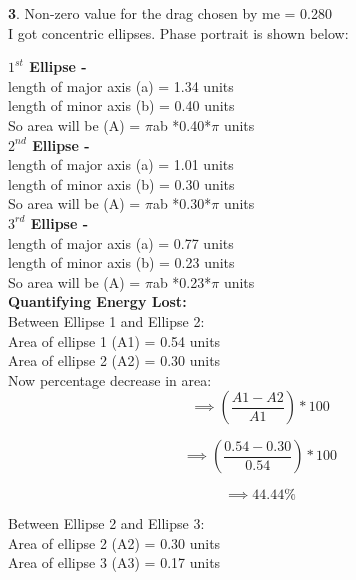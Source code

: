 \documentclass[11pt]{scrartcl} %
\begin{document}
\newpage
\textbf{3}.
Non-zero value for the drag chosen by me = 0.280 \\
I got concentric ellipses. Phase portrait is shown below:


\textbf{$1^{st}$ Ellipse - }\\
length of major axis (a) = 1.34 units\\
length of minor axis (b) = 0.40 units\\

So area will be (A) = $\pi$ab *0.40*$\pi$  units\\

\textbf{$2^{nd}$ Ellipse - }\\
length of major axis (a) = 1.01 units\\
length of minor axis (b) = 0.30 units\\

So area will be (A) = $\pi$ab *0.30*$\pi$  units\\

\textbf{$3^{rd}$ Ellipse - }\\
length of major axis (a) = 0.77 units\\
length of minor axis (b) = 0.23 units\\

So area will be (A) = $\pi$ab *0.23*$\pi$  units\\

\textbf{Quantifying Energy Lost:}\\
Between Ellipse 1 and Ellipse 2:\\

Area of ellipse 1 (A1) = 0.54 units\\
Area of ellipse 2 (A2) = 0.30 units\\

Now percentage decrease in area:
\begin{equation*}
\implies (\frac{A1-A2}{A1})*100
\end{equation*}

\begin{equation*}
\implies (\frac{0.54-0.30}{0.54})*100
\end{equation*}

\begin{equation*}
\implies 44.44\%
\end{equation*}

Between Ellipse 2 and Ellipse 3:\\

Area of ellipse 2 (A2) = 0.30 units\\
Area of ellipse 3 (A3) = 0.17 units\\
\end{document}
